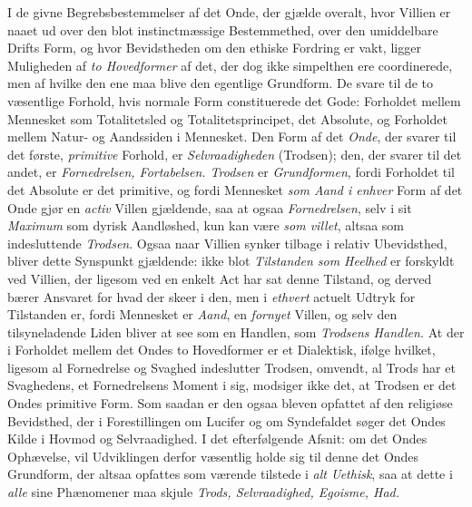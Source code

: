 I de givne Begrebsbestemmelser af det Onde, der gjælde overalt, hvor Villien er
naaet ud over den blot instinctmæssige Bestemmethed, over den umiddelbare Drifts
Form, og hvor Bevidstheden om den ethiske Fordring er vakt, ligger Muligheden af
\emph{to Hovedformer} af det, der dog ikke simpelthen ere coordinerede, men af
hvilke den ene maa blive den egentlige Grundform. De svare til de to væsentlige
Forhold, hvis normale Form constituerede det Gode: Forholdet mellem Mennesket som
Totalitetsled og Totalitetsprincipet, det Absolute, og Forholdet mellem Natur- og
Aandssiden i Mennesket. Den Form af det \emph{Onde}, der svarer til det første,
\emph{primitive} Forhold, er \emph{Selvraadigheden} (Trodsen); den, der svarer
til det andet, er \emph{Fornedrelsen, Fortabelsen. Trodsen} er
\emph{Grundformen}, fordi Forholdet til det Absolute er det primitive, og fordi
Mennesket \emph{som Aand i enhver} Form af det Onde gjør en \emph{activ} Villen
gjældende, saa at ogsaa \emph{Fornedrelsen}, selv i sit \emph{Maximum} som dyrisk
Aandløshed, kun kan være \emph{som villet}, altsaa som indesluttende
\emph{Trodsen}. Ogsaa naar Villien synker tilbage i relativ Ubevidsthed, bliver
dette Synspunkt gjældende: ikke blot \emph{Tilstanden som Heelhed} er forskyldt
ved Villien, der ligesom ved en enkelt Act har sat denne Tilstand, og derved
bærer Ansvaret for hvad der skeer i den, men i \emph{ethvert} actuelt Udtryk for
Tilstanden er, fordi Mennesket er \emph{Aand}, en \emph{fornyet} Villen, og selv
 den tilsyneladende Liden bliver at see som en Handlen, som \emph{Trodsens
Handlen.} At der i Forholdet mellem det Ondes to Hovedformer er et Dialektisk,
ifølge hvilket, ligesom al Fornedrelse og Svaghed indeslutter Trodsen, omvendt,
al Trods har et Svaghedens, et Fornedrelsens Moment i sig, modsiger ikke det, at
Trodsen er det Ondes primitive Form. Som saadan er den ogsaa bleven opfattet af
den religiøse Bevidsthed, der i Forestillingen om Lucifer og om Syndefaldet søger
det Ondes Kilde i Hovmod og Selvraadighed. I det efterfølgende Afsnit: om det
Ondes Ophævelse, vil Udviklingen derfor væsentlig holde sig til denne det Ondes
Grundform, der altsaa opfattes som værende tilstede i \emph{alt Uethisk}, saa at
dette i \emph{alle} sine Phænomener maa skjule \emph{Trods, Selvraadighed,
Egoisme, Had.}

